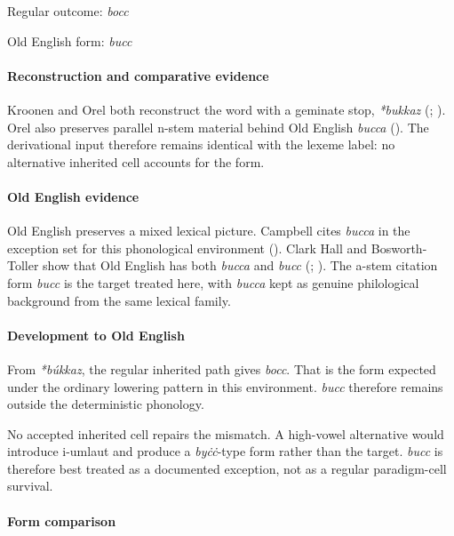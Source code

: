\documentclass[
  british,
  a4paper,
]{article}
\begin{document}
Regular outcome: \emph{bocc}

Old English form: \emph{bucc}

\paragraph{Reconstruction and comparative
evidence}\label{reconstruction-and-comparative-evidence-72}

Kroonen and Orel both reconstruct the word with a geminate stop,
\emph{*bukkaz} (;
). Orel also preserves parallel
n-stem material behind Old English \emph{bucca}
(). The derivational input
therefore remains identical with the lexeme label: no alternative
inherited cell accounts for the form.

\paragraph{Old English evidence}\label{old-english-evidence-72}

Old English preserves a mixed lexical picture. Campbell cites
\emph{bucca} in the exception set for this phonological environment
(). Clark Hall and
Bosworth-Toller show that Old English has both \emph{bucca} and
\emph{bucc} (;
). The
a-stem citation form \emph{bucc} is the target treated here, with
\emph{bucca} kept as genuine philological background from the same
lexical family.

\paragraph{Development to Old
English}\label{development-to-old-english-72}

From \emph{*búkkaz}, the regular inherited path gives \emph{bocc}. That
is the form expected under the ordinary lowering pattern in this
environment. \emph{bucc} therefore remains outside the deterministic
phonology.

No accepted inherited cell repairs the mismatch. A high-vowel
alternative would introduce i-umlaut and produce a \emph{byċċ}-type form
rather than the target. \emph{bucc} is therefore best treated as a
documented exception, not as a regular paradigm-cell survival.

\paragraph{Form comparison}\label{form-comparison-3}
\end{document}
